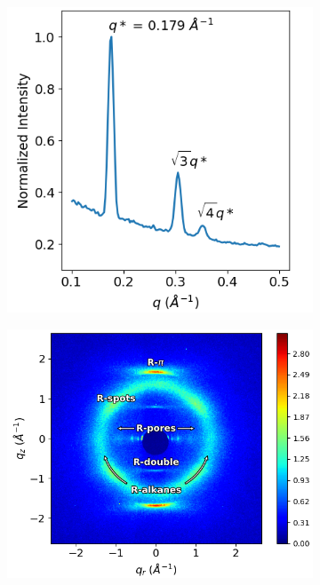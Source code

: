 \documentclass[journal=jpcbfk,manuscript=article]{achemso}
\begin{document}
  \begin{figure}[!htb]
        \centering
        \begin{subfigure}[t]{0.405\linewidth}
                \centering
                \includegraphics[width=\linewidth]{SAXS.png}
                \caption{}\label{fig:SAXS}
        \end{subfigure}
        \begin{subfigure}[t]{0.495\linewidth}
                \centering
                \includegraphics[width=\linewidth]{WAXS_annotated_words.png} 

\end{subfigure}
\end{figure}
\end{document}
